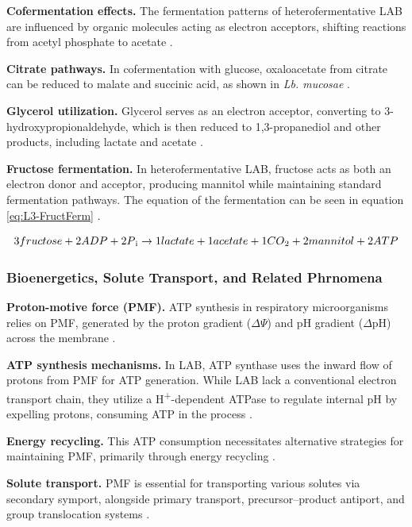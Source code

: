 \textbf{Cofermentation effects.} The fermentation patterns of heterofermentative LAB are influenced by organic molecules acting as electron acceptors, shifting reactions from acetyl phosphate to acetate \cite*{L3-LAB}.

\textbf{Citrate pathways.} In cofermentation with glucose, oxaloacetate from citrate can be reduced to malate and succinic acid, as shown in \textit{Lb. mucosae} \cite*{L3-LAB}.

\textbf{Glycerol utilization.} Glycerol serves as an electron acceptor, converting to 3-hydroxypropionaldehyde, which is then reduced to 1,3-propanediol and other products, including lactate and acetate \cite*{L3-LAB}.

\textbf{Fructose fermentation.} In heterofermentative LAB, fructose acts as both an electron donor and acceptor, producing mannitol while maintaining standard fermentation pathways. The equation of the fermentation can be seen in equation \ref*{eq:L3-FructFerm} \cite*{L3-LAB}.

\begin{equation}
    3fructose + 2ADP + 2P\textsubscript{i} \rightarrow 1lactate + 1acetate + 1CO\textsubscript{2} + 2 mannitol + 2ATP
    \label{eq:L3-FructFerm}
\end{equation}

\subsubsection{Bioenergetics, Solute Transport, and Related Phrnomena}
\textbf{Proton-motive force (PMF).} ATP synthesis in respiratory microorganisms relies on PMF, generated by the proton gradient ($\Delta$$\Psi$) and pH gradient ($\Delta$pH) across the membrane \cite*{L3-LAB}.

\textbf{ATP synthesis mechanisms.} In LAB, ATP synthase uses the inward flow of protons from PMF for ATP generation. While LAB lack a conventional electron transport chain, they utilize a H\textsuperscript{+}-dependent ATPase to regulate internal pH by expelling protons, consuming ATP in the process \cite*{L3-LAB}.

\textbf{Energy recycling.} This ATP consumption necessitates alternative strategies for maintaining PMF, primarily through energy recycling \cite*{L3-LAB}.

\textbf{Solute transport.} PMF is essential for transporting various solutes via secondary symport, alongside primary transport, precursor–product antiport, and group translocation systems \cite*{L3-LAB}.

